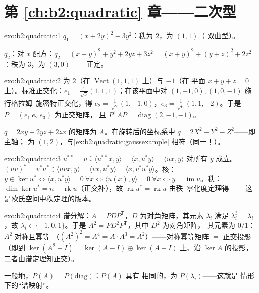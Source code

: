 \section*{第 \ref{ch:b2:quadratic} 章——二次型}

\begin{solution}{exo:b2:quadratic:1}
$q_1 = (x + 2y)^2 - 3y^2$：秩为 $2$，为 $(1, 1)$（
双曲型）。

$q_2$：对 $x$ 配方：$q_2 = (x + y)^2 + y^2 + 2yz +
3z^2 = (x+y)^2 + (y + z)^2 + 2z^2$：秩为 $3$，为 $(3, 0)$
——正定。
\end{solution}

\begin{solution}{exo:b2:quadratic:2}
为 $2$（在 $\operatorname{Vect}(1,1,1)$ 上）与 $-1$（在
平面 $x + y + z = 0$ 上）。标准正交化：$e_1 =
\frac{1}{\sqrt3}(1,1,1)$；在该平面中对 $(1,-1,0),
(1,0,-1)$ 施行格拉姆–施密特正交化，得 $e_2 = \frac{1}{\sqrt2}(1,-1,0)$，$e_3 =
\frac{1}{\sqrt6}(1,1,-2)$。于是 $P = (e_1\ e_2\ e_3)$ 为正交矩阵，
且 $P^{\mathsf T}AP = \operatorname{diag}(2,-1,-1)$。

 $q = 2xy + 2yz + 2zx$ 的矩阵为 $A$。在旋转后的坐标系中
$q = 2X^2 - Y^2 - Z^2$——即主轴；
为 $(1,2)$，与\cref{ex:b2:quadratic:gaussexample}
相符（同一！）。
\end{solution}

\begin{solution}{exo:b2:quadratic:3}
$u^{**} = u$：$\langle u^{**}x, y\rangle = \langle x, u^*y\rangle =
\langle ux, y\rangle$ 对所有 $y$ 成立。$(uv)^* = v^*u^*$：$\langle
uvx, y\rangle = \langle vx, u^*y\rangle = \langle x,
v^*u^*y\rangle$。核：$y \in \ker u^* \iff \langle x, u^*y
\rangle = 0\ \forall x \iff \langle u(x), y\rangle = 0\ \forall x
\iff y \perp \operatorname{im} u$。秩：$\dim\ker u^* = n -
\operatorname{rk} u$（正交补），故
$\operatorname{rk} u^* = \operatorname{rk} u$ 由秩–零化度定理得——
这是欧氏空间中秩定理的版本。
\end{solution}

\begin{solution}{exo:b2:quadratic:4}
谱分解：$A = PDP^{\mathsf T}$，$D$ 为对角矩阵，其元素
$\lambda_i$ 满足 $\lambda_i^3 = \lambda_i$，故 $\lambda_i \in
\{-1, 0, 1\}$。于是 $A^2 = PD^2P^{\mathsf T}$，其中 $D^2$ 为对角矩阵，
其元素为 $0/1$：$A^2$ 对称且幂等
（$(A^2)^2 = A^4 = A\cdot A^3 = A^2$）——对称幂等矩阵
$=$ 正交投影（即到
$\ker(A^2 - I) = \ker(A-I)\oplus\ker(A+I)$ 上、沿 $\ker A$ 的投影，
二者由谱定理知正交）。

一般地，$P(A) = P\!\left(\text{diag}\right)$：$P(A)$ 具有
相同的，为 $P(\lambda_i)$——这就是
情形下的“谱映射”。
\end{solution}

